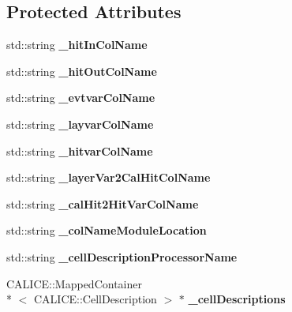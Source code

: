 \subsection*{Protected Attributes}
\begin{DoxyCompactItemize}
\item 
std\-::string {\bfseries \-\_\-hit\-In\-Col\-Name}\label{classCALICE_1_1StdVariablesProcessor_aadc6a49bb1e52a556f5ea399c9109e37}

\item 
std\-::string {\bfseries \-\_\-hit\-Out\-Col\-Name}\label{classCALICE_1_1StdVariablesProcessor_a45016350cf5217ee91e26d0c1f65dd63}

\item 
std\-::string {\bfseries \-\_\-evtvar\-Col\-Name}\label{classCALICE_1_1StdVariablesProcessor_aa7184fe7a54cd2d14c540ff1dde40fa7}

\item 
std\-::string {\bfseries \-\_\-layvar\-Col\-Name}\label{classCALICE_1_1StdVariablesProcessor_a2603f6c8b008cc1664085639d2d126e4}

\item 
std\-::string {\bfseries \-\_\-hitvar\-Col\-Name}\label{classCALICE_1_1StdVariablesProcessor_a1ed0c7668fb83ef5f9d8809d8dd92928}

\item 
std\-::string {\bfseries \-\_\-layer\-Var2\-Cal\-Hit\-Col\-Name}\label{classCALICE_1_1StdVariablesProcessor_ae92a6b1e7862f19928c46065a89e7261}

\item 
std\-::string {\bfseries \-\_\-cal\-Hit2\-Hit\-Var\-Col\-Name}\label{classCALICE_1_1StdVariablesProcessor_a0e63c9196e848c264f8d9ddd3d026132}

\item 
std\-::string {\bfseries \-\_\-col\-Name\-Module\-Location}\label{classCALICE_1_1StdVariablesProcessor_a66e290ab85d79c37f8ea62fead7bbbf8}

\item 
std\-::string {\bfseries \-\_\-cell\-Description\-Processor\-Name}\label{classCALICE_1_1StdVariablesProcessor_ae2f041e65e02919bcbe5c0c35873a1a8}

\item 
C\-A\-L\-I\-C\-E\-::\-Mapped\-Container\\*
$<$ C\-A\-L\-I\-C\-E\-::\-Cell\-Description $>$ $\ast$ {\bfseries \-\_\-cell\-Descriptions}\label{classCALICE_1_1StdVariablesProcessor_a1209cbdaf500094f904a5bad385c2efb}


\end{DoxyCompactItemize}
